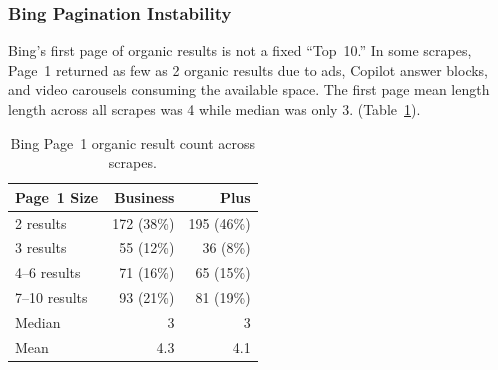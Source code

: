 \subsubsection{Bing Pagination Instability}
\label{sec:bing-pagination-instability}

Bing's first page of organic results is not a fixed ``Top~10.'' In some scrapes,
Page~1 returned as few as 2 organic results due to ads, Copilot answer
 blocks, and video carousels consuming the available space. The first page mean length length across all scrapes was 4 while median was only 3. (Table~\ref{tab:bing-page1-size}).

\begin{table}[H]
\centering
\caption{Bing Page~1 organic result count across scrapes.}
\label{tab:bing-page1-size}
\small
\begin{tabular}{lrr}
\toprule
Page~1 Size & Business & Plus \\
\midrule
2 results & 172 (38\%) & 195 (46\%) \\
3 results & 55 (12\%) & 36 (8\%) \\
4--6 results & 71 (16\%) & 65 (15\%) \\
7--10 results & 93 (21\%) & 81 (19\%) \\
\midrule
Median & 3 & 3 \\
Mean & 4.3 & 4.1 \\
\bottomrule
\end{tabular}
\end{table}


